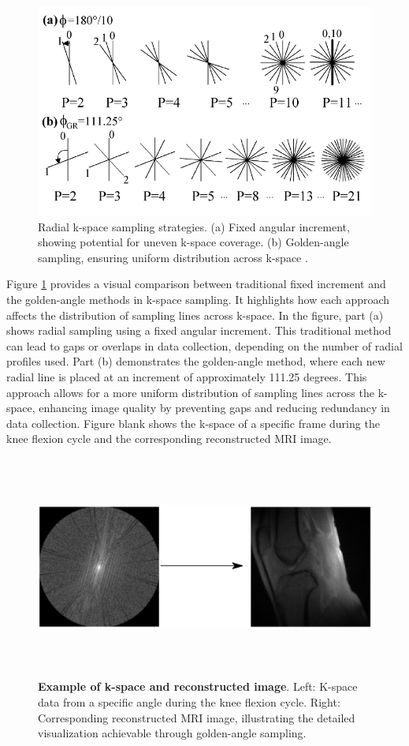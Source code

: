 \documentclass{micro-econ-thesis}
\begin{document}
\begin{figure}[H]
	\centering
	\includegraphics[width=0.7\linewidth]{golden_angle_figure}
	\caption{Radial k-space sampling strategies. (a) Fixed angular increment, showing potential for uneven k-space coverage. (b) Golden-angle sampling, ensuring uniform distribution across k-space \parencite{winkelmann_optimal_2007}.}
	\label{fig:goldenanglefigure}
\end{figure}

 
Figure \ref{fig:goldenanglefigure} provides a visual comparison between traditional fixed increment and the golden-angle methods in k-space sampling. It highlights how each approach affects the distribution of sampling lines across k-space. In the figure, part (a) shows radial sampling using a fixed angular increment. This traditional method can lead to gaps or overlaps in data collection, depending on the number of radial profiles used. Part (b) demonstrates the golden-angle method, where each new radial line is placed at an increment of approximately 111.25 degrees. This approach allows for a more uniform distribution of sampling lines across the k-space, enhancing image quality by preventing gaps and reducing redundancy in data collection. Figure blank  shows the k-space of a specific frame during the knee flexion cycle and the corresponding reconstructed MRI image.
\begin{figure}[H]
	\centering
	\includegraphics[width=0.9\linewidth, height=7.3cm]{kspace_arrow}
	\caption{\textbf{Example of k-space and reconstructed image}. Left: K-space data from a specific angle during the knee flexion cycle. Right: Corresponding reconstructed MRI image, illustrating the detailed visualization achievable through golden-angle sampling.}
	\label{fig:kspacearrow}
\end{figure}
  
\end{document}
